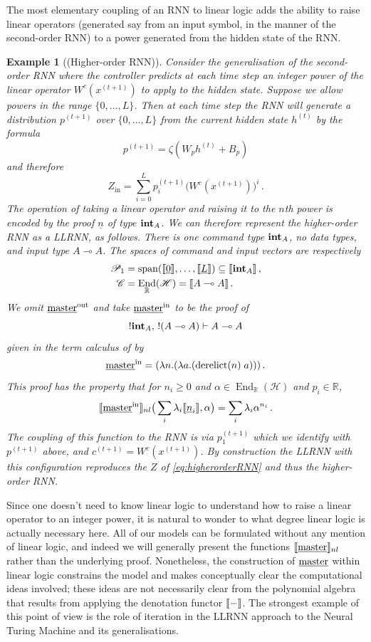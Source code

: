 \documentclass[english,letter paper,12pt,leqno]{article}
\theoremstyle{example}
\newtheorem{example}[theorem]{Example}
\numberwithin{equation}{section}
\def\be{\begin{equation}}
\def\ee{\end{equation}}
\DeclareMathOperator{\End}{End}
\DeclareMathOperator{\derelict}{derelict}
\begin{document}
The most elementary coupling of an RNN to linear logic adds the ability to raise linear operators (generated say from an input symbol, in the manner of the second-order RNN) to a power generated from the hidden state of the RNN. 

\begin{example}[(Higher-order RNN)] Consider the generalisation of the second-order RNN where the controller predicts at each time step an integer power of the linear operator $W^c(x^{(t+1)})$ to apply to the hidden state. Suppose we allow powers in the range $\{0,\ldots,L\}$. Then at each time step the RNN will generate a distribution $p^{(t+1)}$ over $\{0,\ldots,L\}$ from the current hidden state $h^{(t)}$ by the formula
\[
p^{(t+1)} = \zeta( W_p h^{(t)} + B_p )
\]
and therefore
\be\label{eq:higherorderRNN}
Z_{\operatorname{in}} = \sum_{i=0}^L p_i^{(t+1)} \big( W^c(x^{(t+1)}) \big)^i\,.
\ee
The operation of taking a linear operator and raising it to the $n$th power is encoded by the proof $\underline{n}$ of type $\textbf{int}_A$. We can therefore represent the higher-order RNN as a LLRNN, as follows. There is one command type $\textbf{int}_A$, no data types, and input type $A \multimap A$. The spaces of command and input vectors are respectively
\begin{align*}
\mathscr{P}_1 &= \operatorname{span}(\den{\underline{0}}, \ldots, \den{\underline{L}}) \subseteq \den{\inta_A}\,,\\
\mathscr{C} &= \End_{\mathbb{R}}(\mathscr{H}) = \den{A \multimap A}\,.
\end{align*}
We omit $\underline{\textup{master}}^{\mathrm{out}}$ and take $\underline{\textup{master}}^{\mathrm{in}}$ to be the proof of
\[
{!}\textbf{int}_A, \, {!}(A \multimap A) \vdash A \multimap A
\]
given in the term calculus of \cite{benton_etal} by
\[
\master^{\mathrm{in}} = (\lambda n. (\lambda a. (\derelict(n) \; a)))\,.
\]
This proof has the property that for $n_i \ge 0$ and $\alpha \in \End_{\mathbb{R}}(\mathscr{H})$ and $p_i \in \mathbb{R}$,
\be
\den{\master^{\mathrm{in}}}_{nl}\big( \sum_i \lambda_i \den{\underline{n}_i}, \alpha \big) = \sum_i \lambda_i \alpha^{n_i}\,.
\ee
The coupling of this function to the RNN is via $p_1^{(t+1)}$ which we identify with $p^{(t+1)}$ above, and $c^{(t+1)} = W^c(x^{(t+1)})$. By construction the LLRNN with this configuration reproduces the $Z$ of \eqref{eq:higherorderRNN} and thus the higher-order RNN.
\end{example}

Since one doesn't need to know linear logic to understand how to raise a linear operator to an integer power, it is natural to wonder to what degree linear logic is actually necessary here. All of our models can be formulated without any mention of linear logic, and indeed we will generally present the functions $\llbracket \underline{\textup{master}} \rrbracket_{nl}$ rather than the underlying proof. Nonetheless, the construction of $\underline{\textup{master}}$ within linear logic constrains the model and makes conceptually clear the computational ideas involved; these ideas are not necessarily clear from the polynomial algebra that results from applying the denotation functor $\llbracket - \rrbracket$. The strongest example of this point of view is the role of iteration in the LLRNN approach to the Neural Turing Machine and its generalisations.
\end{document}

